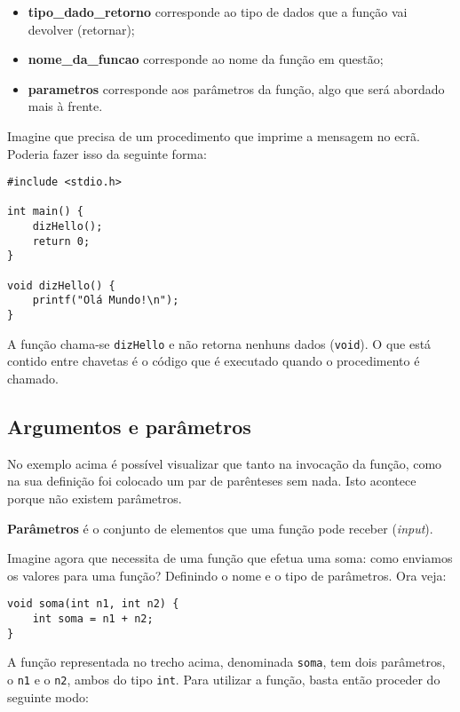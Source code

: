 \begin{itemize}
\item \textbf{tipo\_dado\_retorno} corresponde ao tipo de dados que a função vai devolver (retornar);
\item \textbf{nome\_da\_funcao} corresponde ao nome da função em questão;
\item \textbf{parametros} corresponde aos parâmetros da função, algo que será abordado mais à frente.
\end{itemize}

Imagine que precisa de um procedimento que imprime a mensagem  no ecrã. Poderia fazer isso da seguinte forma:

\begin{lstlisting}
#include <stdio.h>
 
int main() {
    dizHello();
    return 0;
}
 
void dizHello() {
    printf("Olá Mundo!\n");
}
\end{lstlisting}

A função chama-se \texttt{dizHello} e não retorna nenhuns dados (\texttt{void}). O que está contido entre chavetas é o código que é executado quando o procedimento é chamado.

\subsection{Argumentos e parâmetros}

No exemplo acima é possível visualizar que tanto na invocação da função, como na sua definição foi colocado um par de parênteses sem nada. Isto acontece porque não existem parâmetros.

\begin{defi}
\textbf{Parâmetros} é o conjunto de elementos que uma função pode receber (\textit{input}).
\end{defi}

Imagine agora que necessita de uma função que efetua uma soma: como enviamos os valores para uma função? Definindo o nome e o tipo de parâmetros. Ora veja:

\begin{lstlisting}
void soma(int n1, int n2) {
    int soma = n1 + n2;
}
\end{lstlisting}

A função representada no trecho acima, denominada \texttt{soma}, tem dois parâmetros, o \texttt{n1} e o \texttt{n2}, ambos do tipo \texttt{int}. Para utilizar a função, basta então proceder do seguinte modo:

